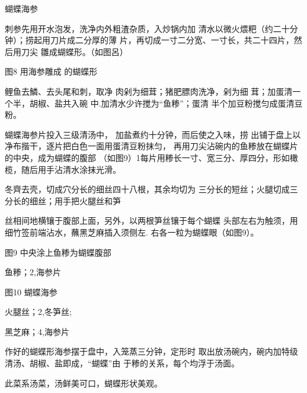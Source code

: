 \begin{recipe}{蝴蝶海参}

\ingredients



\cooking

\step 刺参先用开水泡发，洗净内外粗渣杂质，入炒锅内加 清水以微火煨粑（约二十分钟）；捞起用刀片成二分厚的薄 片，再切成一寸二分宽、一寸长，共二十四片，然后用刀尖 雛成蝴蝶形。（如图呂）

图8 用海参雕成 的蝴蝶形

\step 鲤鱼去鱗、去头尾和刺，取净 肉剁为细茸；猪肥膘肉洗净，剁为细 茸；加蛋清一个半，胡椒、盐共入碗 中.加清水少许搅为“鱼糁”；蛋清 半个加豆粉搅匀成蛋清豆粉。

\step 蝴蝶海参片投入三级清汤中， 加盐煮约十分钟，而后使之入味，捞 出铺于盘上以净布揩干，逐片把白色一面用蛋清豆粉抹匀， 再用刀尖沾碗内的鱼糁放在蝴蝶片的中央，成为蝴蝶的腹部 （如图9）1每片用糁长一寸、宽三分、厚四分，形如橄 榄，随后用手沾清水涂抹光滑。

\step 冬齊去壳，切成穴分长的细丝四十八根，其余均切为 三分长的短丝；火腿切成三分长的细丝；用手把火腿丝和笋

丝相间地横镶于腹部上面，另外，以两根笋丝镶于每个蝴蝶 头部左右为触须，用细竹签前端沾水，蘸黑芝麻插入须侧左. 右各一粒为蝴蝶眼（如图9）。

图9 中央涂上鱼糁为蝴蝶腹部

\step 鱼糁；2,海参片

图10 蝴蝶海参

\step 火腿丝；2,冬笋丝;

\step 黑芝麻；4,海参片

\step 作好的蝴蝶形海参摆于盘中，入笼蒸三分钟，定形时 取出放汤碗内，碗内加特级清汤、胡椒、盐即成，“蝴蝶”由 于糁的关系，每个均浮于汤面。

\notes

此菜系汤菜，汤鲜美可口，蝴蝶形状美观。

\end{recipe}

